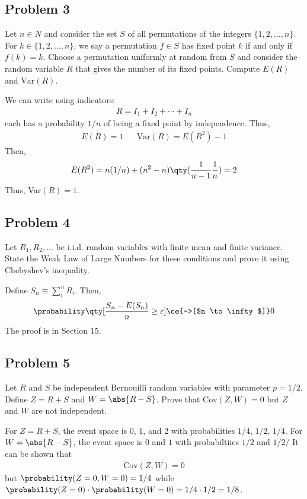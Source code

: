 \subsection{Problem 3}
Let $n \in N$ and consider the set $S$ of all permutations of the integers $\{1, 2, \ldots , n\}$. For $k \in \{1, 2, \ldots , n\}$, we say a permutation $f \in S$ has fixed point $k$ if and only if $f(k) = k$. Choose a permutation uniformly at random from $S$ and consider the random variable $R$ that gives the number of its fixed points. Compute $E(R)$ and $\text{Var}(R)$.
\begin{solution}
    We can write using indicators:
    \begin{align}
        R = I_1 + I_2 + \cdots + I_n
    \end{align}
    each has a probability $1/n$ of being a fixed point by independence. Thus,
    \begin{align}
        E(R) = 1 && \text{Var}(R) = E(R^2) - 1
    \end{align}
    Then,
    \begin{align}
        E(R^2) = n(1/n) + (n^2-n)\qty(\frac{1}{n-1}\frac{1}{n}) = 2
    \end{align}
    Thus, Var$(R) = 1$.
\end{solution}

\subsection{Problem 4}
Let $R_1, R_2, \ldots$ be i.i.d. random variables with finite mean and finite variance. State the Weak Law of Large Numbers for these conditions and prove it using Chebyshev’s inequality.
\begin{solution}
    Define $S_n \equiv \sum_i^n R_i$. Then,
    \begin{align}
        \probability\qty[\frac{S_n - E(S_n)}{n} \ge \varepsilon] \ce{->[$n \to \infty$]} 0
    \end{align}
    The proof is in Section 15.
\end{solution}

\subsection{Problem 5}
Let $R$ and $S$ be independent Bernouilli random variables with parameter $p = 1/2$. Define $Z = R + S$ and $W = \abs{R - S}$. Prove that $\text{Cov}(Z, W) = 0$ but $Z$ and $W$ are not independent.
\begin{solution}
    For $Z = R+S$, the event space is $0$, $1$, and $2$ with probabilities $1/4$, $1/2$, $1/4$. For $W = \abs{R - S}$, the event space is $0$ and $1$ with probabiltiies $1/2$ and $1/2$/ It can be shown that
    \begin{align}
        \text{Cov}(Z,W) = 0
    \end{align}
    but $\probability(Z = 0, W = 0) = 1/4$ while $\probability(Z = 0)\cdot \probability(W = 0) = 1/4 \cdot 1/2 = 1/8$.
\end{solution}

